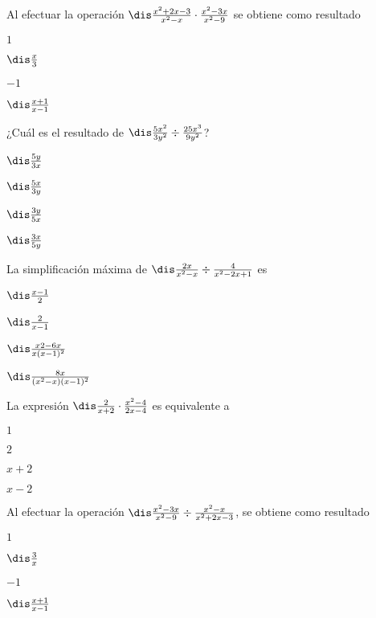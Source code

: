 \documentclass[12pt, fleqn]{article}
\begin{document}
\item Al efectuar la operación $\dis\frac{x^2+2x-3}{x^2-x}\cdot\frac{x^2-3x}{x^2-9}$ se obtiene como resultado
\vp

\benu
\item[] \opc $1$
\item[] \opc $\dis\frac x3$
\item[] \opc $-1$
\item[] \opc $\dis\frac{x+1}{x-1}$
\eenu

\pagebreak

\item ¿Cuál es el resultado de  $\dis\frac{5x^2}{3y^2}\div\frac{25x^3}{9y^2}$?
\benu
\item[] \opc $\dis\frac{5y}{3x}$
\item[] \opc $\dis\frac{5x}{3y}$
\item[] \opc $\dis\frac{3y}{5x}$
\item[] \opc $\dis\frac{3x}{5y}$
\eenu\vs

\item La simplificación máxima de $\dis\frac{2x}{x^2-x}\div\frac{4}{x^2-2x+1}$ es \vp

\benu
\item[] \opc $\dis\frac{x-1}{2}$
\item[] \opc $\dis\frac{2}{x-1}$
\item[] \opc $\dis\frac{x2-6x}{x(x-1)^2}$
\item[] \opc $\dis\frac{8x}{(x^2-x)(x-1)^2}$
\eenu
\vp

\item La expresión $\dis\frac{2}{x+2}\cdot\frac{x^2-4}{2x-4}$ es equivalente a \vp

\benu
\item[] \opc $1$
\item[] \opc $2$
\item[] \opc $x+2$
\item[] \opc $x-2$
\eenu
\vp

\item Al efectuar la operación $\dis\frac{x^2-3x}{x^2-9}\div\frac{x^2-x}{x^2+2x-3}$, se obtiene como resultado
\benu
\item[] \opc $1$
\item[] \opc $\dis\frac 3x$
\item[] \opc $-1$
\item[] \opc $\dis\frac{x+1}{x-1}$
\eenu\vs

\eenu
\pagebreak

\end{document}
